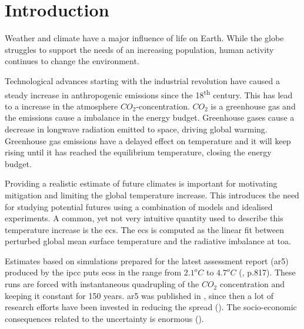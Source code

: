 \chapter{Introduction} \label{ch:introduction}
Weather and climate have a major influence of life on Earth. While the globe struggles to support the needs of an increasing population, human activity continues to change the environment. %

Technological advances starting with the industrial revolution have caused a steady increase in anthropogenic emissions since the 18\textsuperscript{th} century. %
This has lead to a increase in the atmosphere $CO_2$-concentration. $CO_2$ is a greenhouse gas and the emissions cause a imbalance in the energy budget. Greenhouse gases cause a decrease in longwave radiation emitted to space, driving global warming. Greenhouse gas emissions have a delayed effect on temperature and it will keep rising until it has reached the equilibrium temperature, closing the energy budget. 

Providing a realistic estimate of future climates is important for motivating mitigation and limiting the global temperature increase. 
This introduces the need for studying potential futures using a combination of models and idealised experiments. A common, yet not very intuitive quantity used to describe this temperature increase is the \acrfull{ecs}. 
The \acrshort{ecs} is computed as the linear fit between perturbed global mean surface temperature and the radiative imbalance at \acrfull{toa}. 

Estimates based on %
simulations prepared for the latest assessment report (\acrshort{ar5}) produced by the \acrfull{ipcc} puts \acrshort{ecs}s in the range from $2.1^oC$ to $4.7^oC$ (\cite{IPCC_CH9_climate_models}, p.817). These runs are forced with instantaneous quadrupling of the $CO_2$ concentration %
and keeping it constant for 150 years.  
\acrshort{ar5} was published in \citeyear{IPCC_entire_book}, since then a lot of research efforts have been invested in reducing the spread (\cite{Cox2018}). %
The socio-economic consequences related to the uncertainty is enormous (\cite{bony2015}). 

